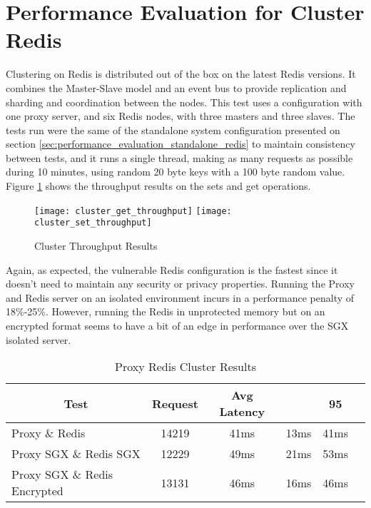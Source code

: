 \section{Performance Evaluation for Cluster Redis}
\label{sec:performance_evaluation_cluster_redis}

Clustering on Redis is distributed out of the box on the latest Redis versions. It combines the Master-Slave model and an event bus to provide replication and sharding and coordination between the nodes. This test uses a configuration with one proxy server, and six Redis nodes, with three masters and three slaves. The tests run were the same of the standalone system configuration presented on section \ref{sec:performance_evaluation_standalone_redis} to maintain consistency between tests, and it runs a single thread, making as many requests as possible during 10 minutes, using random 20 byte keys with a 100 byte random value. Figure \ref{fig:cluster_throughput_results} shows the throughput results on the sets and get operations.

\begin{figure}[htbp]
  \centering
    {\texttt{[image: cluster\_get\_throughput]}}%
    {\texttt{[image: cluster\_set\_throughput]}}%
  \caption{Cluster Throughput Results}
  \label{fig:cluster_throughput_results}
\end{figure}

Again, as expected, the vulnerable Redis configuration is the fastest since it doesn't need to maintain any security or privacy properties. Running the Proxy and Redis server on an isolated environment incurs in a performance penalty of 18\%-25\%. However, running the Redis in unprotected memory but on an encrypted format seems to have a bit of an edge in performance over the \gls{SGX} isolated server.

\begin{table}[ht]
	\caption{Proxy Redis Cluster Results}
	\label{tab:proxy_redis_cluster_latency_results}
\centering
\begin{tabular}{lccccc}
	\toprule
	\multicolumn{1}{c}{\textbf{Test}} & \pmb{\#}\textbf{Request} & \textbf{Avg Latency} & \pmb{\ensuremath{\sigma}} & \textbf{95}\pmb{\%} \\
	\midrule
		Proxy \& Redis & 14219 & 41ms & 13ms & 41ms  				\\
		Proxy SGX \& Redis SGX & 12229 & 49ms & 21ms & 53ms  		\\
		Proxy SGX \& Redis Encrypted & 13131 & 46ms & 16ms & 46ms 	\\
	\bottomrule
\end{tabular}
\end{table}

